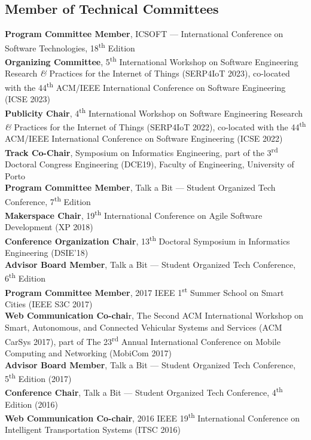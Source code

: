 \documentclass[10pt, a4paper]{article}
\newcommand{\FEUP}{Faculty of Engineering, University of Porto}
\newcommand{\years}[1]{\marginnote{\raggedleft\footnotesize #1}}
\begin{document}
\subsection*{Member of Technical Committees}

\years{2023} 
\textbf{Program Committee Member}, ICSOFT --- International Conference on Software Technologies, 18\textsuperscript{th} Edition\\[0.42em]
\textbf{Organizing Committee}, 5\textsuperscript{th} International Workshop on Software Engineering Research \textit{\&} Practices for the Internet of Things (SERP4IoT 2023), co-located with the 44\textsuperscript{th} ACM/IEEE International Conference on Software Engineering (ICSE 2023)
\\[0.42em]
\years{2022} \textbf{Publicity Chair}, 4\textsuperscript{th} International Workshop on Software Engineering Research \textit{\&} Practices for the Internet of Things (SERP4IoT 2022), co-located with the 44\textsuperscript{th} ACM/IEEE International Conference on Software Engineering (ICSE 2022)
\\[0.42em]
\years{2019} \textbf{Track Co-Chair}, Symposium on Informatics Engineering, part of the 3\textsuperscript{rd} Doctoral Congress Engineering (DCE19), \FEUP
\\[0.42em]
\textbf{Program Committee Member}, Talk a Bit --- Student Organized Tech Conference, 7\textsuperscript{th} Edition
\\[0.42em]
\years{2018} \textbf{Makerspace Chair}, 19\textsuperscript{th} International Conference on Agile Software Development (XP 2018)
\\[0.42em] 
\textbf{Conference Organization Chair}, 13\textsuperscript{th} Doctoral Symposium in Informatics Engineering (DSIE'18)
\\[0.42em] 
\textbf{Advisor Board Member}, Talk a Bit --- Student Organized Tech Conference, 6\textsuperscript{th} Edition
\\[0.42em]
\years{2017} \textbf{Program Committee Member}, 2017 IEEE 1\textsuperscript{st} Summer School on Smart Cities (IEEE S3C 2017)
\\[0.42em]
\textbf{Web Communication Co-chai}r, The Second ACM International Workshop on Smart, Autonomous, and Connected Vehicular Systems and Services (ACM CarSys 2017), part of The 23\textsuperscript{rd} Annual International Conference on Mobile Computing and Networking (MobiCom 2017)
\\[0.42em]
\textbf{Advisor Board Member}, Talk a Bit --- Student Organized Tech Conference, 5\textsuperscript{th} Edition (2017)
\\[0.42em]
\years{2016} \textbf{Conference Chair}, Talk a Bit --- Student Organized Tech Conference, 4\textsuperscript{th} Edition (2016)
\\[0.42em]
\textbf{Web Communication Co-chair}, 2016 IEEE 19\textsuperscript{th} International Conference on Intelligent Transportation Systems (ITSC 2016)
\end{document}
